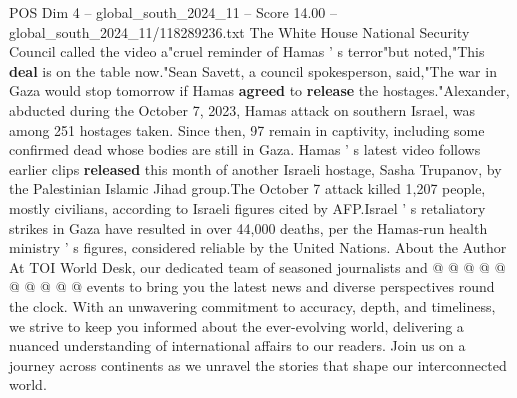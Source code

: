 \begin{textsample}{POS Dim 4 – global\_south\_2024\_11 – Score 14.00 – global\_south\_2024\_11/118289236.txt}
The White House National Security Council called the video a"cruel reminder of Hamas ' s terror"but noted,"This \textbf{deal} is on the table now."Sean Savett, a council spokesperson, said,"The war in Gaza would stop tomorrow if Hamas \textbf{agreed} to \textbf{release} the hostages."Alexander, abducted during the October 7, 2023, Hamas attack on southern Israel, was among 251 hostages taken.
Since then, 97 remain in captivity, including some confirmed dead whose bodies are still in Gaza.
Hamas ' s latest video follows earlier clips \textbf{released} this month of another Israeli hostage, Sasha Trupanov, by the Palestinian Islamic Jihad group.The October 7 attack killed 1,207 people, mostly civilians, according to Israeli figures cited by AFP.Israel ' s retaliatory strikes in Gaza have resulted in over 44,000 deaths, per the Hamas-run health ministry ' s figures, considered reliable by the United Nations.
About the Author At TOI World Desk, our dedicated team of seasoned journalists and @ @ @ @ @ @ @ @ @ @ events to bring you the latest news and diverse perspectives round the clock.
With an unwavering commitment to accuracy, depth, and timeliness, we strive to keep you informed about the ever-evolving world, delivering a nuanced understanding of international affairs to our readers.
Join us on a journey across continents as we unravel the stories that shape our interconnected world.

\end{textsample}
